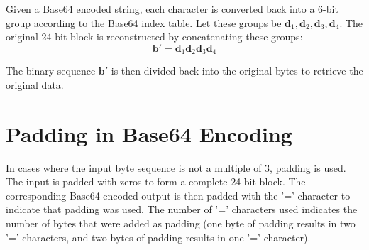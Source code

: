 Given a Base64 encoded string, each character is converted back into a 6-bit group according to the Base64 index table. Let these groups be $\mathbf{d}_1, \mathbf{d}_2, \mathbf{d}_3, \mathbf{d}_4$. The original 24-bit block is reconstructed by concatenating these groups:
\[\mathbf{b}' = \mathbf{d}_1 \mathbf{d}_2 \mathbf{d}_3 \mathbf{d}_4\]

The binary sequence $\mathbf{b}'$ is then divided back into the original bytes to retrieve the original data.

\section{Padding in Base64 Encoding}
In cases where the input byte sequence is not a multiple of 3, padding is used. The input is padded with zeros to form a complete 24-bit block. The corresponding Base64 encoded output is then padded with the '=' character to indicate that padding was used. The number of '=' characters used indicates the number of bytes that were added as padding (one byte of padding results in two '=' characters, and two bytes of padding results in one '=' character).
